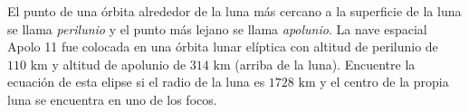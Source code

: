 \item El punto de una órbita alrededor de la luna más cercano a la superficie de la luna se llama \textit{perilunio} y el punto más lejano se llama \textit{apolunio}. La nave espacial Apolo 11 fue colocada en una órbita lunar elíptica con altitud de perilunio de $110 \text{ km}$ y altitud de apolunio de $314 \text{ km}$ (arriba de la luna). Encuentre la ecuación de esta elipse si el radio de la luna es $1728 \text{ km}$ y el centro de la propia luna se encuentra en uno de los focos.
